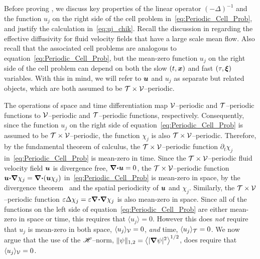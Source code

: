 \documentclass[amsa]{ipart}
\begin{document}
Before proving , we discuss key
properties of the linear operator $(-\Delta)^{-1}$ and the function $u_j$
on the right side of the cell problem
in~\eqref{eq:Periodic_Cell_Prob}, and justify the calculation 
in~\eqref{eq:uj_chik}. Recall the discussion in 
regarding the effective diffusivity for fluid velocity fields that
have a large scale mean flow. Also recall that the associated cell
problems are analogous to equation~\eqref{eq:Periodic_Cell_Prob}, but
the mean-zero function $u_j$ on the right side of the cell problem can
depend on both the slow $(t,\boldsymbol{x})$ and fast $(\tau,\mbox{\boldmath${\xi}$})$
variables. With this in mind, we will refer to $\boldsymbol{u}$ and $u_j$ as
separate but related objects, which are both assumed to be
$\mathcal{T}\times\mathcal{V}$--periodic.  




The operations of space and 
time differentiation map $\mathcal{V}$--periodic and $\mathcal{T}$--periodic functions
to $\mathcal{V}$--periodic and $\mathcal{T}$--periodic functions,
respectively. Consequently, since the function $u_j$ on the 
right side of equation~\eqref{eq:Periodic_Cell_Prob} is assumed to 
be $\mathcal{T}\times\mathcal{V}$--periodic, the function $\chi_j$ is also
$\mathcal{T}\times\mathcal{V}$--periodic. Therefore, by the fundamental theorem of
calculus, the $\mathcal{T}\times\mathcal{V}$--periodic function $\partial_t\chi_j$
in~\eqref{eq:Periodic_Cell_Prob} is mean-zero in time. Since the
$\mathcal{T}\times\mathcal{V}$--periodic fluid velocity field $\boldsymbol{u}$ is 
divergence free, $\mbox{\boldmath${\nabla}$}\mbox{\boldmath${\cdot}$}\boldsymbol{u}=0$, the $\mathcal{T}\times\mathcal{V}$--periodic
function $\boldsymbol{u}\mbox{\boldmath${\cdot}$}\mbox{\boldmath${\nabla}$}\chi_j=\mbox{\boldmath${\nabla}$}\mbox{\boldmath${\cdot}$}(\boldsymbol{u}\chi_j)$
in~\eqref{eq:Periodic_Cell_Prob} is mean-zero in space, by the
divergence theorem~\cite{McOwen:2003:PDE} and the spatial periodicity
of $\boldsymbol{u}$ and $\chi_j$. Similarly, the $\mathcal{T}\times\mathcal{V}$--periodic function
$\varepsilon\Delta\chi_j=\varepsilon\mbox{\boldmath${\nabla}$}\mbox{\boldmath${\cdot}$}\mbox{\boldmath${\nabla}$}\chi_j$ is also mean-zero in space.
Since all of the functions on the left side of
equation~\eqref{eq:Periodic_Cell_Prob} are either mean-zero in space
or time, this requires that $\langle u_j\rangle=0$. However this does \emph{not}
require that $u_j$ is mean-zero in both space, $\langle u_j\rangle_{\mathcal{V}}=0$,
\emph{and} time, $\langle u_j\rangle_{\mathcal{T}}=0$. We now argue that the use of the
$\mathscr{H}$--norm, $\|\psi\|_{1,2}=\left\langle|\mbox{\boldmath${\nabla}$} \psi|^2\right\rangle^{1/2}$, does
require that $\langle u_j\rangle_{\mathcal{V}}=0$. 
\end{document}
